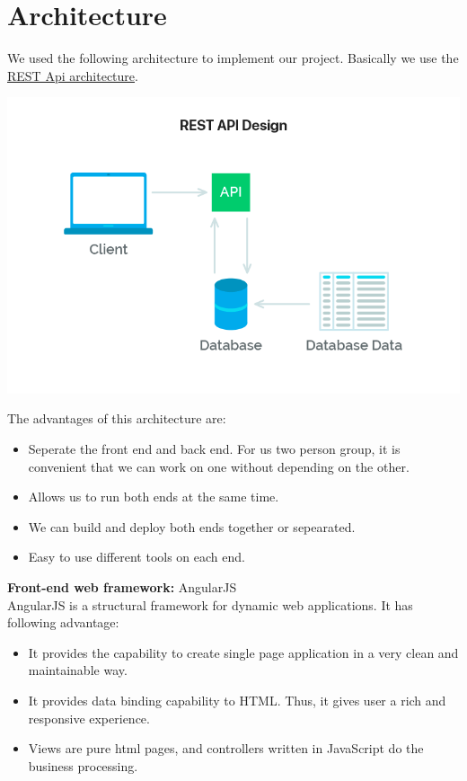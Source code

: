 \documentclass[a4paper,12pt]{article} %
\begin{document}
\section{Architecture}
We used the following architecture to implement our project. Basically we use the \href{https://mlsdev.com/blog/81-a-beginner-s-tutorial-for-understanding-restful-api}{REST Api architecture}. 
\begin{center}
\includegraphics[width=1\textwidth]{REST}
\end{center}
The advantages of this architecture are:
\begin{itemize}
    \item Seperate the front end and back end. For us two person group, it is convenient that we can work on one
    without depending on the other.
    \item Allows us to run both ends at the same time.
    \item We can build and deploy both ends together or sepearated.
    \item Easy to use different tools on each end.
\end{itemize}
\textbf{Front-end web framework:} AngularJS\\[5pt]
AngularJS is a structural framework for dynamic web applications. It has following advantage:
\begin{itemize}
    \item It provides the capability to create single page application in a very clean and maintainable way. 
    \item It provides data binding capability to HTML. Thus, it gives user a rich and responsive experience.
    \item Views are pure html pages, and controllers written in JavaScript do the business processing.
\end{itemize}
\end{document}
